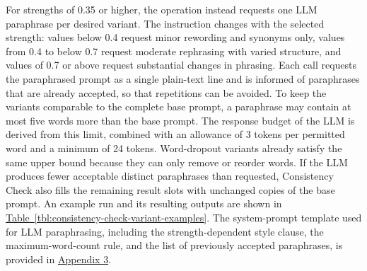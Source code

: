 For strengths of 0.35 or higher, the operation instead requests one LLM paraphrase per desired variant. The instruction changes with the selected strength: values below 0.4 request minor rewording and synonyms only, values from 0.4 to below 0.7 request moderate rephrasing with varied structure, and values of 0.7 or above request substantial changes in phrasing. Each call requests the paraphrased prompt as a single plain-text line and is informed of paraphrases that are already accepted, so that repetitions can be avoided. To keep the variants comparable to the complete base prompt, a paraphrase may contain at most five words more than the base prompt. The response budget of the LLM is derived from this limit, combined with an allowance of 3 tokens per permitted word and a minimum of 24 tokens. Word-dropout variants already satisfy the same upper bound because they can only remove or reorder words. If the LLM produces fewer acceptable distinct paraphrases than requested, Consistency Check also fills the remaining result slots with unchanged copies of the base prompt. An example run and its resulting outputs are shown in \hyperref[tbl:consistency-check-variant-examples]{Table~\ref*{tbl:consistency-check-variant-examples}}. The system-prompt template used for LLM paraphrasing, including the strength-dependent style clause, the maximum-word-count rule, and the list of previously accepted paraphrases, is provided in \hyperref[app:3-consistency-check]{Appendix 3}.

